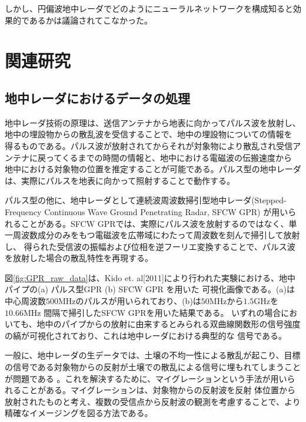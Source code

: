 \documentclass[11pt,a4paper,uplatex,draft]{ujarticle}
\begin{document}
  しかし、円偏波地中レーダでどのようにニューラルネットワークを構成知ると効果的であるかは議論されてこなかった。
\section{関連研究}

  \subsection{地中レーダにおけるデータの処理}

    地中レーダ技術の原理は、送信アンテナから地表に向かってパルス波を放射し、地中の埋設物からの散乱波を受信することで、地中の埋設物についての情報を
    得るものである。パルス波が放射されてからそれが対象物により散乱され受信アンテナに戻ってくるまでの時間の情報と、地中における電磁波の伝搬速度から
    地中における対象物の位置を推定することが可能である。パルス型の地中レーダは、実際にパルスを地表に向かって照射することで動作する。

    パルス型の他に、地中レーダとして連続波周波数掃引型地中レーダ(Stepped-Frequency Continuous Wave Ground Penetrating Radar, SFCW GPR)
    が用いられることがある。SFCW GPRでは、実際にパルス波を放射するのではなく、単一周波数成分のみをもつ電磁波を広帯域にわたって周波数を刻んで掃引して放射し、
    得られた受信波の振幅および位相を逆フーリエ変換することで、パルス波を放射した場合の散乱特性を再現する\cite{stepped_frequency_continuous_wave}。

    図\ref{fig:GPR_raw_data}は、Kido et. al[2011]により行われた実験\cite{STFW_Kido}における、地中パイプの(a) パルス型GPR (b) SFCW GPR を用いた
    可視化画像である。(a)は中心周波数$500\mathrm{MHz}$のパルスが用いられており、(b)は$50\mathrm{MHz}$から$1.5\mathrm{GHz}$を$10.66\mathrm{MHz}$
    間隔で掃引したSFCW GPRを用いた結果である。
    いずれの場合においても、地中のパイプからの放射に由来するとみられる双曲線関数形の信号強度の縞が可視化されており、これは地中レーダにおける典型的な
    信号である。

    一般に、地中レーダの生データでは、土壌の不均一性による散乱が起こり、目標の信号である対象物からの反射が土壌での散乱による信号に埋もれてしまうことが問題である
    \cite{prestack_migration}。これを解決するために、マイグレーションという手法が用いられることがある。マイグレーションは、対象物からの反射波を反射
    体位置から放射されたものと考え、複数の受信点から反射波の観測を考慮することで、より精確なイメージングを図る方法である\cite{gpr_migration}。
\end{document}
